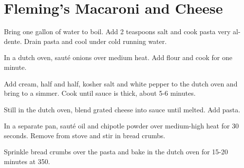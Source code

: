 
\section{Fleming's Macaroni and Cheese}
\begin{recipe}



Bring one gallon of water to boil. Add 2 teaspoons salt and cook pasta very al-dente. Drain pasta and cool under cold running water.


In a dutch oven, sauté onions over medium heat. Add flour and cook for one minute.


Add cream, half and half, kosher salt and white pepper to the dutch oven and bring to a simmer. Cook until sauce is thick, about 5-6 minutes.


Still in the dutch oven, blend grated cheese into sauce until melted. Add pasta.


In a separate pan, sauté oil and chipotle powder over medium-high heat for 30 seconds. Remove from stove and stir in bread crumbs.

Sprinkle bread crumbs over the pasta and bake in the dutch oven for 15-20 minutes at 350\degree{}.

\end{recipe}
